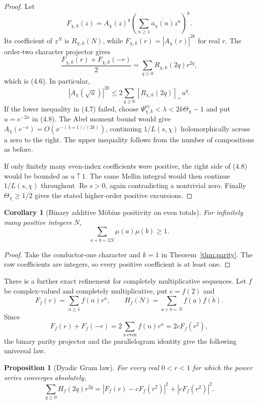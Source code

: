 \documentclass[11pt]{article}
\newtheorem{proposition}[theorem]{Proposition}
\newtheorem{corollary}[theorem]{Corollary}
\theoremstyle{remark}
\newcommand{\Rea}{\operatorname{Re}}
\begin{document}
\begin{proof}
Let
\[
 F_{\chi,k}(z)=A_\chi(z)^k
 \left(\sum_{n\geq1}\overline{a_\chi(n)}z^n\right)^k.
\]
Its coefficient of $z^N$ is $R_{\chi,k}(N)$, while
$F_{\chi,k}(r)=|A_\chi(r)|^{2k}$ for real $r$.  The order-two character projector gives
\[
 \frac{F_{\chi,k}(r)+F_{\chi,k}(-r)}2
 =\sum_{q\geq0}R_{\chi,k}(2q)r^{2q},
\]
which is (4.6).  In particular,
\[
 |A_\chi(\sqrt u)|^{2k}
 \leq2\sum_{q\geq0}[R_{\chi,k}(2q)]_+u^q.                   \tag{4.8}
\]
If the lower inequality in (4.7) failed, choose
$\Psi^{\mathrm{ev}}_{\chi,k}<\lambda<2k\Theta_\chi-1$ and put
$u=e^{-2x}$ in (4.8).  The Abel moment bound would give
$A_\chi(e^{-x})=O(x^{-(\lambda+1)/(2k)})$, continuing $1/L(s,\chi)$
holomorphically across a zero to the right.  The upper inequality follows from the number of
compositions as before.

If only finitely many even-index coefficients were positive, the right side of (4.8) would be
bounded as $u\uparrow1$.  The same Mellin integral would then continue $1/L(s,\chi)$ throughout
$\Rea s>0$, again contradicting a nontrivial zero.  Finally $\Theta_\chi\geq1/2$ gives the stated
higher-order positive excursions.
\end{proof}

\begin{corollary}[Binary additive M\"obius positivity on even totals]
For infinitely many positive integers $N$,
\begin{equation}
 \sum_{a+b=2N}\mu(a)\mu(b)\geq1.                              \tag{4.9}
\end{equation}
\end{corollary}

\begin{proof}
Take the conductor-one character and $k=1$ in Theorem~\ref{thm:parity}.  The raw coefficients are
integers, so every positive coefficient is at least one.
\end{proof}

There is a further exact refinement for completely multiplicative sequences.  Let $f$ be
complex-valued and completely multiplicative, put $c=f(2)$ and
\[
 F_f(r)=\sum_{n\geq1}f(n)r^n,
 \qquad H_f(N)=\sum_{a+b=N}f(a)\overline{f(b)}.
\]
Since
\[
 F_f(r)+F_f(-r)=2\sum_{n\ \mathrm{even}}f(n)r^n=2cF_f(r^2),
\]
the binary parity projector and the parallelogram identity give the following universal law.

\begin{proposition}[Dyadic Gram law]
\label{prop:dyadic}
For every real $0<r<1$ for which the power series converges absolutely,
\begin{equation}
 \boxed{\quad
 \sum_{q\geq0}H_f(2q)r^{2q}
 =|F_f(r)-cF_f(r^2)|^2+|cF_f(r^2)|^2.
 \quad}                                                       \tag{4.10}
\end{equation}
\end{proposition}
\end{document}
